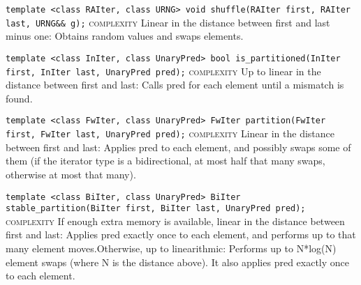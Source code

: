 \noindent{}\hspace*{0.25em}\lstinline[basicstyle=\ttfamily\color{corange}]{template <class RAIter, class URNG> void shuffle(RAIter first, RAIter last, URNG&& g);} \textsc{complexity} Linear in the distance between first and last minus one: Obtains random values and swaps elements.\\\vspace{-0.6em}

\noindent{}\hspace*{0.25em}\lstinline[basicstyle=\ttfamily\color{corange}]{template <class InIter, class UnaryPred> bool is_partitioned(InIter first, InIter last, UnaryPred pred);} \textsc{complexity} Up to linear in the distance between first and last: Calls pred for each element until a mismatch is found.\\\vspace{-0.6em}

\noindent{}\hspace*{0.25em}\lstinline[basicstyle=\ttfamily\color{corange}]{template <class FwIter, class UnaryPred> FwIter partition(FwIter first, FwIter last, UnaryPred pred);} \textsc{complexity} Linear in the distance between first and last: Applies  pred to each element, and possibly swaps some of them (if the iterator type is a bidirectional, at most half that many swaps, otherwise at most that many).\\\vspace{-0.6em}

\noindent{}\hspace*{0.25em}\lstinline[basicstyle=\ttfamily\color{cred}]{template <class BiIter, class UnaryPred> BiIter stable_partition(BiIter first, BiIter last, UnaryPred pred);} \textsc{complexity} If enough extra memory is available, linear in the distance between first and last: Applies pred exactly once to each element, and performs up to that many element moves.Otherwise, up to linearithmic: Performs up to N*log(N) element swaps (where N is the distance above). It also applies pred exactly once to each element.\\\vspace{-0.6em}

